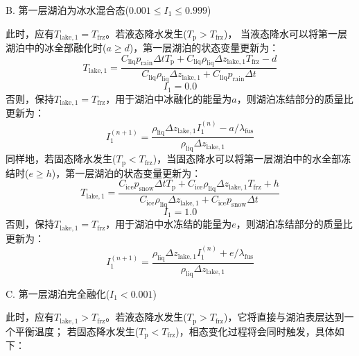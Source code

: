 B. 第一层湖泊为冰水混合态($0.001\leqslant I_1\leqslant 0.999$)

此时，应有$T_{\mathrm{lake,1}}=T_{\mathrm {frz}} $。若液态降水发生($T_{\mathrm {p}} >T_{\mathrm {frz}} $)，
当液态降水可以将第一层湖泊中的冰全部融化时($a\geqslant d$)，第一层湖泊的状态变量更新为：
\begin{equation}
  T_{\mathrm{lake, 1}}=\frac{C_{\mathrm{liq}} p_{\mathrm {rain}} \Delta t T_{\mathrm{p}}+C_{\mathrm{liq}} \rho_{\mathrm{liq}} \Delta z_{\mathrm{lake, 1}} T_{\mathrm {frz}}-d}{C_{\mathrm{liq}} \rho_{\mathrm{liq}} \Delta z_{\mathrm{lake, 1}}+C_{\mathrm{liq}} p_{\mathrm {rain}} \Delta t}
\end{equation}
\begin{equation}
  I_{1}=0.0
\end{equation}
否则，保持$T_{\mathrm{lake,1}}=T_{\mathrm {frz}} $，用于湖泊中冰融化的能量为$a$，则湖泊冻结部分的质量比更新为：
\begin{equation}
  I_{1}^{(n+1)}=\frac{\rho_{\mathrm{liq}} \Delta z_{\mathrm{lake, 1}} I_{1}^{(n)}-a / \lambda_{\mathrm {fus}}}{\rho_{\mathrm{liq}} \Delta z_{\mathrm{lake, 1}}}
\end{equation}
同样地，若固态降水发生($T_{\mathrm {p}} <T_{\mathrm {frz}} $)，当固态降水可以将第一层湖泊中的水全部冻结时($e\geqslant h$)，第一层湖泊的状态变量更新为：
\begin{equation}
  T_{\mathrm{lake, 1}}=\frac{C_{\mathrm{ice}} p_{\mathrm {snow}} \Delta t T_{\mathrm{p}}+C_{\mathrm{ice}} \rho_{\mathrm{liq}} \Delta z_{\mathrm{lake, 1}} T_{\mathrm {frz}}+h}{C_{\mathrm{ice}} \rho_{\mathrm{liq}} \Delta z_{\mathrm{lake, 1}}+C_{\mathrm{ice}} p_{\mathrm {snow}} \Delta t}
\end{equation}
\begin{equation}
  I_{1}=1.0
\end{equation}
否则，保持$T_{\mathrm{lake,1}}=T_{\mathrm {frz}} $，用于湖泊中水冻结的能量为$e$，则湖泊冻结部分的质量比更新为：
\begin{equation}
  I_{1}^{(n+1)}=\frac{\rho_{\mathrm{liq}} \Delta z_{\mathrm{lake, 1}} I_{1}^{(n)}+e / \lambda_{\mathrm {fus}}}{\rho_{\mathrm{liq}} \Delta z_{\mathrm{lake, 1}}}
\end{equation}

C. 	第一层湖泊完全融化($I_1<0.001$)

此时，应有$T_{\mathrm{lake,1}}>T_{\mathrm {frz}} $。若液态降水发生($T_{\mathrm {p}} >T_{\mathrm {frz}} $)，它将直接与湖泊表层达到一个平衡温度；
若固态降水发生($T_{\mathrm {p}} <T_{\mathrm {frz}} $)，相态变化过程将会同时触发，具体如下：

